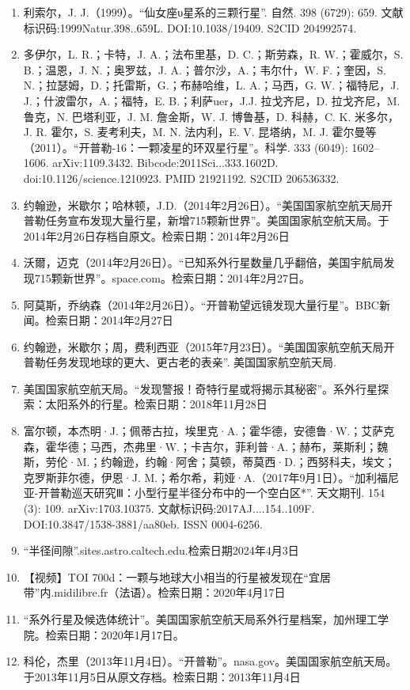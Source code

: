 \begin{enumerate}
\item 利索尔，J. J.（1999）。“仙女座υ星系的三颗行星”. 自然. 398 (6729): 659. 文献标识码:1999Natur.398..659L. DOI:10.1038/19409. S2CID 204992574.
\item 多伊尔，L. R.；卡特，J. A.；法布里基，D. C.；斯劳森，R. W.；霍威尔，S. B.；温恩，J. N.；奥罗兹，J. A.；普尔沙，A.；韦尔什，W. F.；奎因，S. N.；拉瑟姆，D.；托雷斯，G.；布赫哈维，L. A.；马西，G. W.；福特尼，J. J.；什波雷尔，A.；福特，E. B.；利萨uer，J.J. 拉戈齐尼，D. 拉戈齐尼，M. 鲁克，N. 巴塔利亚，J. M. 詹金斯，W. J. 博鲁基，D. 科赫，C. K. 米多尔，J. R. 霍尔，S. 麦考利夫，M. N. 法内利，E. V. 昆塔纳，M. J. 霍尔曼等（2011）。“开普勒-16：一颗凌星的环双星行星”。科学. 333 (6049): 1602–1606. arXiv:1109.3432. Bibcode:2011Sci...333.1602D. doi:10.1126/science.1210923. PMID 21921192. S2CID 206536332.
\item 约翰逊，米歇尔；哈林顿，J.D.（2014年2月26日）。“美国国家航空航天局开普勒任务宣布发现大量行星，新增715颗新世界”。美国国家航空航天局。于2014年2月26日存档自原文。检索日期：2014年2月26日
\item 沃爾，迈克（2014年2月26日）。“已知系外行星数量几乎翻倍，美国宇航局发现715颗新世界”。space.com。检索日期：2014年2月27日。
\item 阿莫斯，乔纳森（2014年2月26日）。“开普勒望远镜发现大量行星”。BBC新闻。检索日期：2014年2月27日
\item 约翰逊，米歇尔；周，费利西亚（2015年7月23日）。“美国国家航空航天局开普勒任务发现地球的更大、更古老的表亲”. 美国国家航空航天局.
\item 美国国家航空航天局。“发现警报！奇特行星或将揭示其秘密”。系外行星探索：太阳系外的行星。检索日期：2018年11月28日
\item 富尔顿，本杰明·J.；佩蒂古拉，埃里克·A.；霍华德，安德鲁·W.；艾萨克森，霍华德；马西，杰弗里·W.；卡吉尔，菲利普·A.；赫布，莱斯利；魏斯，劳伦·M.；约翰逊，约翰·阿舍；莫顿，蒂莫西·D.；西努科夫，埃文；克罗斯菲尔德，伊恩·J. M.；希尔希，莉娅·A.（2017年9月1日）。“加利福尼亚-开普勒巡天研究Ⅲ：小型行星半径分布中的一个空白区*”. 天文期刊. 154 (3): 109. arXiv:1703.10375. 文献标识码:2017AJ....154..109F. DOI:10.3847/1538-3881/aa80eb. ISSN 0004-6256.
\item “半径间隙”.sites.astro.caltech.edu.检索日期2024年4月3日
\item 【视频】TOI 700d：一颗与地球大小相当的行星被发现在“宜居带”内.midilibre.fr（法语）。检索日期：2020年4月17日
\item “系外行星及候选体统计”。美国国家航空航天局系外行星档案，加州理工学院。检索日期：2020年1月17日。
\item 科伦，杰里（2013年11月4日）。“开普勒”。nasa.gov。美国国家航空航天局。于2013年11月5日从原文存档。检索日期：2013年11月4日

\end{enumerate}
